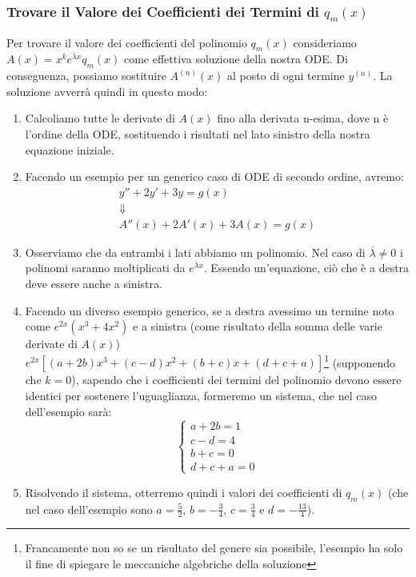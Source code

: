 \documentclass[a4paper,11pt]{article}
\begin{document}
\subsubsection[\texorpdfstring{Coefficienti di $q_m(x)$}{Coefficienti di q(x)}]{Trovare il Valore dei Coefficienti dei Termini di $q_m(x)$}
Per trovare il valore dei coefficienti del polinomio $q_m(x)$ consideriamo $A(x)=x^k e^{\bar{\lambda} x}q_m(x)$ come effettiva soluzione della nostra ODE. Di conseguenza, possiamo sostituire $A^{(n)}(x)$ al posto di ogni termine $y^{(n)}$. La soluzione avverrà quindi in questo modo:
\begin{enumerate}[label=\alph{enumi}.]
	\item Calcoliamo tutte le derivate di $A(x)$ fino alla derivata n-esima, dove n è l'ordine della ODE, sostituendo i risultati nel lato sinistro della nostra equazione iniziale.
	
	\item Facendo un esempio per un generico caso di ODE di secondo ordine, avremo:
	\begin{equation*}
        \begin{array}{c}
            y''+2y'+3y=g(x)\\
            \Downarrow \\
            A''(x)+2A'(x)+3A(x)=g(x)
        \end{array}
    \end{equation*}	
	
    \item Osserviamo che da entrambi i lati abbiamo un polinomio. Nel caso di $\bar{\lambda}\neq 0$ i polinomi saranno moltiplicati da $e^{\bar{\lambda}x}$. Essendo un'equazione, ciò che è a destra deve essere anche a sinistra.
	
	\item Facendo un diverso esempio generico, se a destra avessimo un termine noto come $e^{2x}(x^3+4x^2)$ e a sinistra (come risultato della somma delle varie derivate di $A(x)$) $e^{2x}[(a+2b)x^3+(c-d)x^2+(b+c)x+(d+c+a)]$\footnote[2]{Francamente non so se un risultato del genere sia possibile, l'esempio ha solo il fine di spiegare le meccaniche algebriche della soluzione} (supponendo che $k=0$), sapendo che i coefficienti dei termini del polinomio devono essere identici per sostenere l'uguaglianza, formeremo un sistema, che nel caso dell'esempio sarà:
	\begin{equation*}
        \begin{cases}
            a+2b=1 \\
            c-d=4 \\
            b+c=0 \\
            d+c+a=0
        \end{cases}
    \end{equation*}
	
    \item Risolvendo il sistema, otterremo quindi i valori dei coefficienti di $q_m(x)$ (che nel caso dell'esempio sono $a=\frac{5}{2}$, $b=-\frac{3}{4}$, $c=\frac{3}{4}$ e $d=-\frac{13}{4}$).
\end{enumerate}
\end{document}
